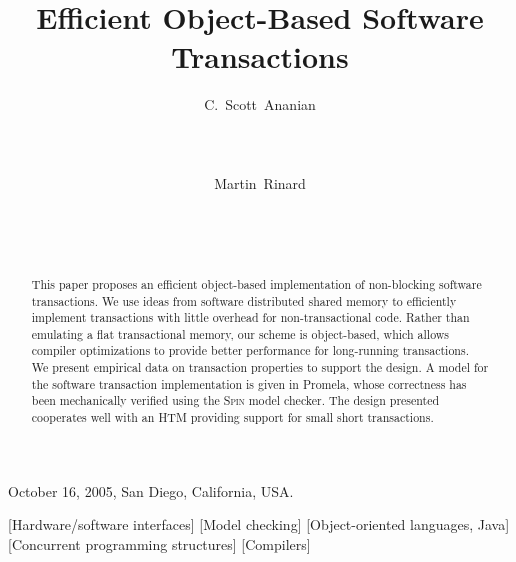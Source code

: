 \documentclass{csa-sig-alternate}
\begin{document}
 {October 16, 2005, San Diego, California, USA.}
\crdata{}
\title{Efficient Object-Based Software Transactions%
%
}
\author{
\alignauthor C.~Scott~Ananian\\
\\
\\
\\
\alignauthor Martin~Rinard\\
\\
\\
\\
}
\maketitle
%
\begin{abstract}
  This paper proposes an efficient object-based implementation of
  non-blocking software transactions.  We use ideas
  from software distributed shared memory to efficiently implement
  transactions with little overhead for non-transactional code.
  Rather than emulating a flat transactional memory, our scheme is
  object-based, which allows compiler optimizations to provide better
  performance for long-running transactions.  
  We present empirical data on transaction properties to support the design.
  A model for the software
  transaction implementation is given in Promela, whose correctness
  has been mechanically verified using the \textsc{Spin} model checker.
  The design presented cooperates well with an HTM providing support
  for small short transactions.
\end{abstract}
[Hardware/software interfaces]
[Model checking]
[Object-oriented languages, Java]
[Concurrent programming structures]
[Compilers]
\end{document}
